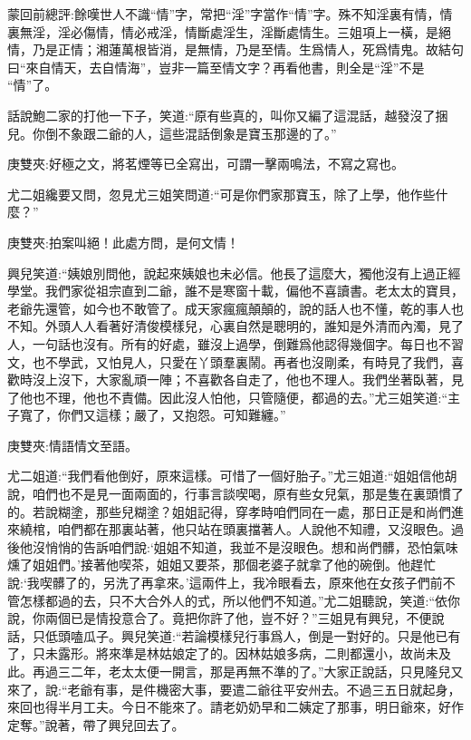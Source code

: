 
\begin{parag}
    \begin{note}蒙回前總評:餘嘆世人不識“情”字，常把“淫”字當作“情”字。殊不知淫裏有情，情裏無淫，淫必傷情，情必戒淫，情斷處淫生，淫斷處情生。三姐項上一橫，是絕情，乃是正情；湘蓮萬根皆消，是無情，乃是至情。生爲情人，死爲情鬼。故結句曰“來自情天，去自情海”，豈非一篇至情文字？再看他書，則全是“淫”不是 “情”了。\end{note}
\end{parag}


\begin{parag}
    話說鮑二家的打他一下子，笑道:“原有些真的，叫你又編了這混話，越發沒了捆兒。你倒不象跟二爺的人，這些混話倒象是寶玉那邊的了。”\begin{note}庚雙夾:好極之文，將茗煙等已全寫出，可謂一擊兩鳴法，不寫之寫也。\end{note}尤二姐纔要又問，忽見尤三姐笑問道:“可是你們家那寶玉，除了上學，他作些什麼？”\begin{note}庚雙夾:拍案叫絕！此處方問，是何文情！\end{note}興兒笑道:“姨娘別問他，說起來姨娘也未必信。他長了這麼大，獨他沒有上過正經學堂。我們家從祖宗直到二爺，誰不是寒窗十載，偏他不喜讀書。老太太的寶貝，老爺先還管，如今也不敢管了。成天家瘋瘋顛顛的，說的話人也不懂，乾的事人也不知。外頭人人看著好清俊模樣兒，心裏自然是聰明的，誰知是外清而內濁，見了人，一句話也沒有。所有的好處，雖沒上過學，倒難爲他認得幾個字。每日也不習文，也不學武，又怕見人，只愛在丫頭羣裏鬧。再者也沒剛柔，有時見了我們，喜歡時沒上沒下，大家亂頑一陣；不喜歡各自走了，他也不理人。我們坐著臥著，見了他也不理，他也不責備。因此沒人怕他，只管隨便，都過的去。”尤三姐笑道:“主子寬了，你們又這樣；嚴了，又抱怨。可知難纏。”\begin{note}庚雙夾:情語情文至語。\end{note}尤二姐道:“我們看他倒好，原來這樣。可惜了一個好胎子。”尤三姐道:“姐姐信他胡說，咱們也不是見一面兩面的，行事言談喫喝，原有些女兒氣，那是隻在裏頭慣了的。若說糊塗，那些兒糊塗？姐姐記得，穿孝時咱們同在一處，那日正是和尚們進來繞棺，咱們都在那裏站著，他只站在頭裏擋著人。人說他不知禮，又沒眼色。過後他沒悄悄的告訴咱們說:‘姐姐不知道，我並不是沒眼色。想和尚們髒，恐怕氣味燻了姐姐們。’接著他喫茶，姐姐又要茶，那個老婆子就拿了他的碗倒。他趕忙說:‘我喫髒了的，另洗了再拿來。’這兩件上，我冷眼看去，原來他在女孩子們前不管怎樣都過的去，只不大合外人的式，所以他們不知道。”尤二姐聽說，笑道:“依你說，你兩個已是情投意合了。竟把你許了他，豈不好？”三姐見有興兒，不便說話，只低頭嗑瓜子。興兒笑道:“若論模樣兒行事爲人，倒是一對好的。只是他已有了，只未露形。將來準是林姑娘定了的。因林姑娘多病，二則都還小，故尚未及此。再過三二年，老太太便一開言，那是再無不準的了。”大家正說話，只見隆兒又來了，說:“老爺有事，是件機密大事，要遣二爺往平安州去。不過三五日就起身，來回也得半月工夫。今日不能來了。請老奶奶早和二姨定了那事，明日爺來，好作定奪。”說著，帶了興兒回去了。
\end{parag}


